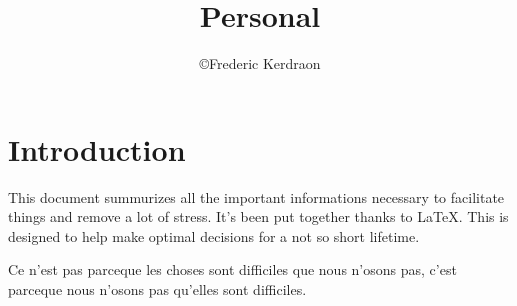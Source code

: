 \documentclass[8pt]{article} %
\title{Personal}
\author{\copyright Frederic Kerdraon}
\begin{document}
\maketitle

\tableofcontents



\section{Introduction}



This document summurizes all the important informations necessary to facilitate things and remove a lot of stress. It's been put together thanks to \LaTeX. This is designed to help make optimal decisions for a not so short lifetime.



{\footnotesize

Ce n'est pas parceque les choses sont difficiles que nous n'osons pas, c'est parceque nous n'osons pas qu'elles sont difficiles.

}






%
%
%
%

%
%
%
%
%
%
%
%

\end{document}
